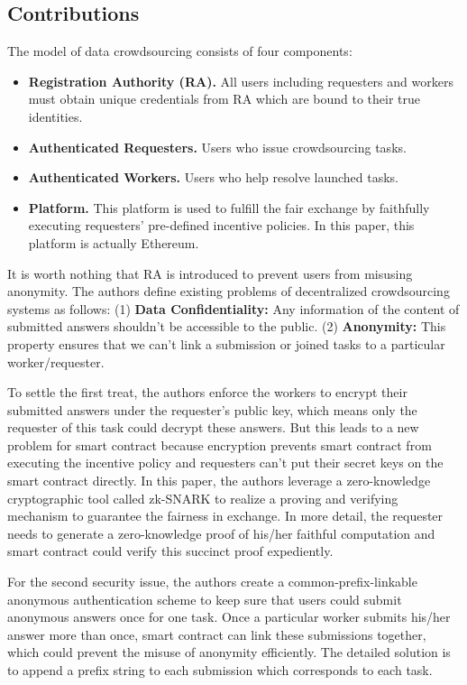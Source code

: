\documentclass[conference]{IEEEtran}
\begin{document}
\subsection{Contributions}
The model of data crowdsourcing consists of four components:
\begin{itemize}
    \item \textbf{Registration Authority (RA).} All users including requesters and workers must obtain unique credentials from RA which are bound to their true identities.
    \item \textbf{Authenticated Requesters.} Users who issue crowdsourcing tasks.
    \item \textbf{Authenticated Workers.} Users who help resolve launched tasks.
    \item \textbf{Platform.} This platform is used to fulfill the fair exchange by faithfully executing requesters' pre-defined incentive policies. In this paper, this platform is actually Ethereum. 
\end{itemize} 

It is worth nothing that RA is introduced to prevent users from misusing anonymity. 
%
The authors define existing problems of decentralized crowdsourcing systems as follows: 
(1) \textbf{Data Confidentiality:} Any information of the content of submitted answers shouldn't be accessible to the public.  
(2) \textbf{Anonymity:} This property ensures that we can't link a submission or joined tasks to a particular worker/requester.

To settle the first treat, the authors enforce the workers to encrypt their submitted answers under the requester's public key, which means only the requester of this task could decrypt these answers.
%
But this leads to a new problem for smart contract because encryption prevents smart contract from executing the incentive policy and requesters can't put their secret keys on the smart contract directly.
%
In this paper, the authors leverage a zero-knowledge cryptographic tool called zk-SNARK to realize a proving and verifying mechanism to guarantee the fairness in exchange.
%
In more detail, the requester needs to generate a zero-knowledge proof of his/her faithful computation and smart contract could verify this succinct proof expediently.

For the second security issue, the authors create a common-prefix-linkable anonymous authentication scheme to keep sure that users could submit anonymous answers once for one task.
%
Once a particular worker submits his/her answer more than once, smart contract can link these submissions together, which could prevent the misuse of anonymity efficiently.
%
The detailed solution is to append a prefix string to each submission which corresponds to each task.
\end{document}
